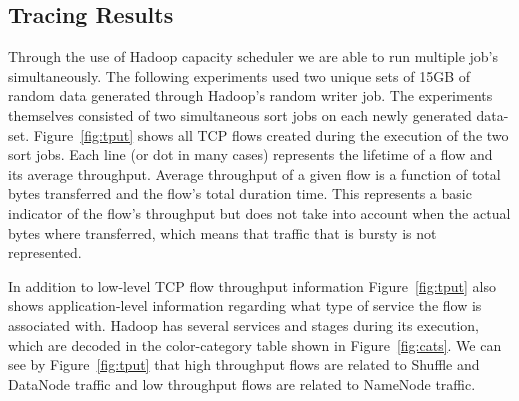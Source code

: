 \subsection{Tracing Results}
\label{ssec:results}
Through the use of Hadoop capacity scheduler we are able to run multiple job's 
simultaneously. The following experiments used two unique sets of 15GB of 
random data generated through Hadoop's random writer job. The experiments themselves
consisted of two simultaneous sort jobs on each newly generated data-set. Figure~\ref{fig:tput} 
shows all TCP flows created during the execution of the two sort jobs. Each line (or dot in 
many cases) represents the lifetime of a flow and its average throughput. Average throughput 
of a given flow is a function of total bytes transferred and the flow's total duration time.
This represents a basic indicator of the flow's throughput but does not take into account 
when the actual bytes where transferred, which means that traffic that is bursty is not
represented.

In addition to low-level TCP flow throughput information Figure~\ref{fig:tput} also shows 
application-level information regarding what type of service the flow is associated with. 
Hadoop has several services and stages during its execution, which are decoded in the 
color-category table shown in Figure~\ref{fig:cats}. We can see by Figure~\ref{fig:tput}
that high throughput flows are related to Shuffle and DataNode traffic and low throughput
flows are related to NameNode traffic.

